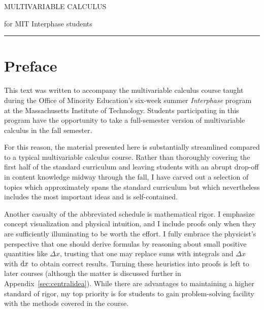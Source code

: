 \documentclass[svgnames]{watsonbook}
\begin{document}
 

\begin{titlepage} 
  \pagecolor{softblue}
  {\titlefont \color{MidnightBlue} MULTIVARIABLE CALCULUS} 
  
  \vspace*{5mm} 
  { \hspace*{9cm} \subtitlefont for MIT Interphase students} \par
  \null\vfill
  \vspace*{1cm}
  \noindent
  \hfill
  \begin{minipage}{0.35\linewidth}
    \begin{flushright}
      \printauthor
    \end{flushright}
  \end{minipage}
  \begin{minipage}{0.02\linewidth}
    \rule{1pt}{125pt}
  \end{minipage}
  \titlepagedecoration
\end{titlepage}


\chapter*{Preface} 

\pagecolor{white} 

This text was written to accompany the multivariable calculus course
taught during the Office of Minority Education's six-week summer
\textit{Interphase} program at the Massachusetts Institute of
Technology. Students participating in this program have the
opportunity to take a full-semester version of multivariable calculus
in the fall semester. 

For this reason, the material presented here is substantially
streamlined compared to a typical multivariable calculus
course. Rather than thoroughly covering the first half of the standard
curriculum and leaving students with an abrupt drop-off in content
knowledge midway through the fall, I have carved out a selection of
topics which approximately spans the standard curriculum but which 
nevertheless includes the most important ideas and is self-contained.

Another casualty of the abbreviated schedule is mathematical rigor. I
emphasize concept visualization and physical intuition, and I include
proofs only when they are sufficiently illuminating to be worth the
effort. I fully embrace the physicist's perspective that one should
derive formulas by reasoning about small positive quantities like
$\Delta x$, trusting that one may replace sums with integrals and
$\Delta x$ with $\mathrm{d} x$ to obtain correct results. Turning these
heuristics into proofs is left to later courses (although the matter
is discussed further in Appendix~\ref{sec:centralidea}). While there
are advantages to maintaining a higher standard of rigor, my top
priority is for students to gain problem-solving facility with the
methods covered in the course.
\end{document}
